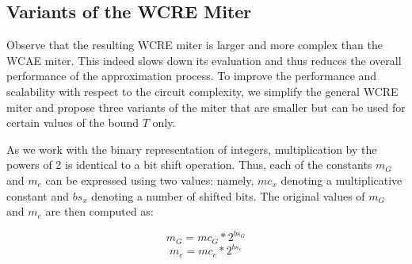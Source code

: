 \documentclass[runningheads]{llncs}
\begin{document}



\subsection{Variants of the WCRE Miter}    

Observe that the resulting WCRE miter is larger and more complex than the WCAE
miter. This indeed slows down its evaluation and thus reduces the overall
performance of the approximation process. To improve the performance and
scalability  with respect to the circuit complexity, we simplify the general
WCRE miter and propose three variants of the miter that are smaller but can be
used for certain values of the bound $T$ only.

As we work with the binary representation of integers, multiplication by the
powers of 2 is identical to a bit shift operation. Thus, each of the constants
$m_{G}$ and $m_{e}$ can be expressed using two values: namely, $mc_{x}$ denoting
a multiplicative constant and $bs_{x}$ denoting a number of shifted bits. The
original values of $m_{G}$ and $m_{e}$ are then computed as:

\vspace{-12mm}
\begin{multicols}{2}
$$m_{G} = mc_{G} * 2^{bs_{G}}$$
\break
$$m_{e} = mc_{e} * 2^{bs_{e}}$$
\end{multicols}
\vspace{0mm}
\end{document}
